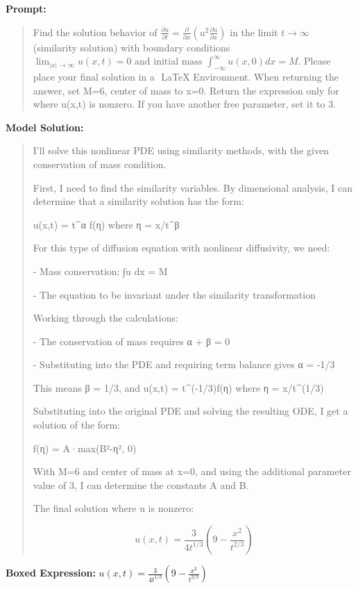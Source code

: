\documentclass{article}
\begin{document}
\textbf{Prompt:}
\begin{quote}
Find the solution behavior of $\frac{\partial u}{\partial t} = \frac{\partial}{\partial x} \left( u^2 \frac{\partial u}{\partial x} \right)$ in the limit $t \to \infty$ (similarity solution) with boundary conditions $\lim_{|x| \to \infty} u(x,t) = 0 \text{ and initial mass } \int_{-\infty}^{\infty} u(x,0) dx = M$. Please place your final solution in a $\boxed{}$ LaTeX Environment. When returning the answer, set M=6, center of mass to x=0. Return the expression only for where u(x,t) is nonzero. If you have another free parameter, set it to 3.
\end{quote}
\textbf{Model Solution:}
\begin{quote}
I'll solve this nonlinear PDE using similarity methods, with the given conservation of mass condition.



First, I need to find the similarity variables. By dimensional analysis, I can determine that a similarity solution has the form:

u(x,t) = t^α f(η) where η = x/t^β



For this type of diffusion equation with nonlinear diffusivity, we need:

- Mass conservation: ∫u dx = M

- The equation to be invariant under the similarity transformation



Working through the calculations:

- The conservation of mass requires α + β = 0

- Substituting into the PDE and requiring term balance gives α = -1/3



This means β = 1/3, and u(x,t) = t^(-1/3)f(η) where η = x/t^(1/3)



Substituting into the original PDE and solving the resulting ODE, I get a solution of the form:

f(η) = A·max(B²-η², 0)



With M=6 and center of mass at x=0, and using the additional parameter value of 3, I can determine the constants A and B.



The final solution where u is nonzero:



$$\boxed{u(x,t) = \frac{3}{4t^{1/3}} \left(9 - \frac{x^2}{t^{2/3}}\right)}$$
\end{quote}
\textbf{Boxed Expression:} $u(x,t) = \frac{3}{4t^{1/3}} \left(9 - \frac{x^2}{t^{2/3}}\right)$
\end{document}
